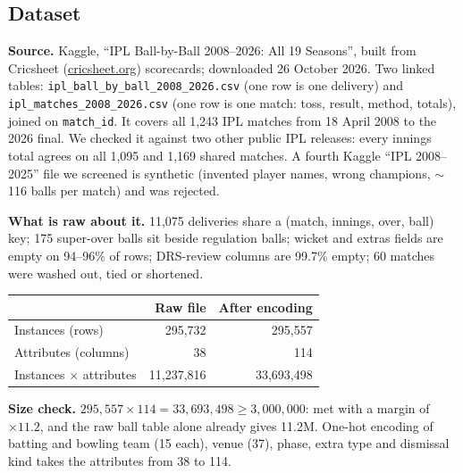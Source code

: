 \documentclass[10pt,a4paper]{article}
\begin{document}
\vspace{4pt}
\begin{multicols}{2}
\raggedcolumns

\section{Dataset}
\textbf{Source.} Kaggle, ``IPL Ball-by-Ball 2008--2026: All 19 Seasons'', built from Cricsheet (\href{https://cricsheet.org}{cricsheet.org}) scorecards; downloaded 26 October 2026. Two linked tables: \texttt{ipl\_ball\_by\_ball\_2008\_2026.csv} (one row is one delivery) and \texttt{ipl\_matches\_2008\_2026.csv} (one row is one match: toss, result, method, totals), joined on \texttt{match\_id}. It covers all 1,243 IPL matches from 18 April 2008 to the 2026 final. We checked it against two other public IPL releases: every innings total agrees on all 1,095 and 1,169 shared matches. A fourth Kaggle ``IPL 2008--2025'' file we screened is synthetic (invented player names, wrong champions, $\sim$116 balls per match) and was rejected.

\textbf{What is raw about it.} 11,075 deliveries share a (match, innings, over, ball) key; 175 super-over balls sit beside regulation balls; wicket and extras fields are empty on 94--96\% of rows; DRS-review columns are 99.7\% empty; 60 matches were washed out, tied or shortened.

{\small
\begin{tabularx}{\columnwidth}{@{}Lrr@{}}
\toprule
 & \textbf{Raw file} & \textbf{After encoding}\\
\midrule
Instances (rows) & 295,732 & 295,557\\
Attributes (columns) & 38 & 114\\
Instances $\times$ attributes & 11,237,816 & 33,693,498\\
\bottomrule
\end{tabularx}}

\textbf{Size check.} $295{,}557 \times 114 = 33{,}693{,}498 \geq 3{,}000{,}000$: met with a margin of $\times 11.2$, and the raw ball table alone already gives 11.2M. One-hot encoding of batting and bowling team (15 each), venue (37), phase, extra type and dismissal kind takes the attributes from 38 to 114.


\end{multicols}
\end{document}
